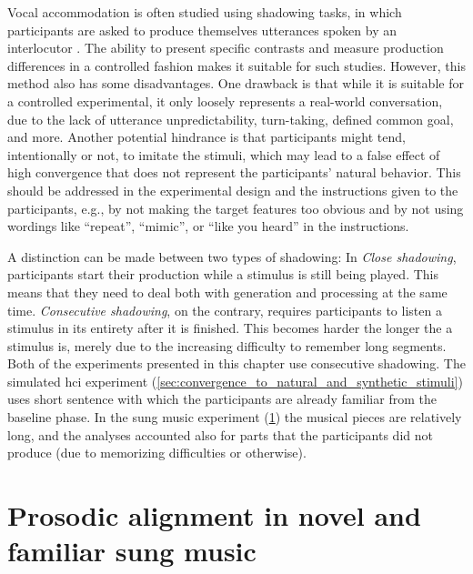 Vocal accommodation is often studied using shadowing tasks, in which participants are asked to produce themselves utterances spoken by an interlocutor \citep[e.g.,][]{Pardo2018comparison, Babel2014novelty, Shockley2004imitation, Walker2015repeat, Dias2016visibilivty, Dias2016visibilivty}.
The ability to present specific contrasts and measure production differences in a controlled fashion makes it suitable for such studies.
However, this method also has some disadvantages.
One drawback is that while it is suitable for a controlled experimental, it only loosely represents a real-world conversation, due to the lack of utterance unpredictability, turn-taking, defined common goal, and more.
Another potential hindrance is that participants might tend, intentionally or not, to imitate the stimuli, which may lead to a false effect of high convergence that does not represent the participants' natural behavior.
This should be addressed in the experimental design and the instructions given to the participants, e.g., by not making the target features too obvious and by not using wordings like \enquote{repeat}, \enquote{mimic}, or \enquote{like you heard} in the instructions.

A distinction can be made between two types of shadowing:
In \emph{Close shadowing}, participants start their production while a stimulus is still being played.
This means that they need to deal both with generation and processing at the same time.
\emph{Consecutive shadowing}, on the contrary, requires participants to listen a stimulus in its entirety after it is finished.
This becomes harder the longer the a stimulus is, merely due to the increasing difficulty to remember long segments.
Both of the experiments presented in this chapter use consecutive shadowing.
The simulated \ac{hci} experiment (\cref{sec:convergence_to_natural_and_synthetic_stimuli}) uses short sentence with which the participants are already familiar from the baseline phase. 
In the sung music experiment (\cref{sec:alignment_in_novel_and_familiar_sung_music}) the musical pieces are relatively long, and the analyses accounted also for parts that the participants did not produce (due to memorizing difficulties or otherwise).

\section{Prosodic alignment in novel and familiar sung music}
\label{sec:alignment_in_novel_and_familiar_sung_music}

